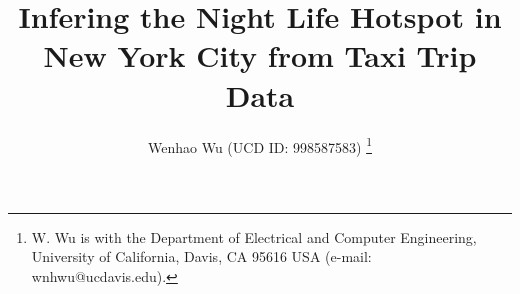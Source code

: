 \documentclass[journal]{IEEEtran}
\begin{document}
%
\title{Infering the Night Life Hotspot in New York City from Taxi Trip Data}
%
%
%

\author{
  Wenhao Wu (UCD ID: 998587583)
  \vspace{-1.5em} %
  \thanks{W. Wu is with the Department of Electrical and Computer
  Engineering, University of California, Davis, CA 95616 USA (e-mail:
  wnhwu@ucdavis.edu).}%
}

% 
%



% 
\end{document}
